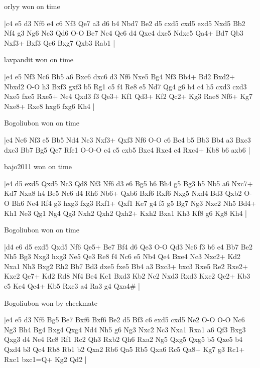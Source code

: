 \showboard

orlyy won on time

\makegametitle
|c4 e5 d3 Nf6 e4 c6 Nf3 Qe7 a3 d6 b4 Nbd7 Be2 d5 cxd5 cxd5 exd5 Nxd5 Bb2 Nf4 g3 Ng6 Nc3 Qd6 O-O Be7 Ne4 Qc6 d4 Qxe4 dxe5 Ndxe5 Qa4+ Bd7 Qb3 Nxf3+ Bxf3 Qe6 Bxg7 Qxb3 Rab1  |

\showboard

lavpandit won on time

\makegametitle
|e4 e5 Nf3 Nc6 Bb5 a6 Bxc6 dxc6 d3 Nf6 Nxe5 Bg4 Nf3 Bb4+ Bd2 Bxd2+ Nbxd2 O-O h3 Bxf3 gxf3 b5 Rg1 c5 f4 Re8 e5 Nd7 Qg4 g6 h4 c4 h5 cxd3 cxd3 Nxe5 fxe5 Rxe5+ Ne4 Qxd3 f3 Qe3+ Kf1 Qd3+ Kf2 Qc2+ Kg3 Rae8 Nf6+ Kg7 Nxe8+ Rxe8 hxg6 fxg6 Kh4  |

\showboard

Bogoliubon won on time

\makegametitle
|e4 Nc6 Nf3 e5 Bb5 Nd4 Nc3 Nxf3+ Qxf3 Nf6 O-O c6 Bc4 b5 Bb3 Bb4 a3 Bxc3 dxc3 Bb7 Bg5 Qe7 Rfe1 O-O-O c4 c5 cxb5 Bxe4 Rxe4 c4 Rxc4+ Kb8 b6 axb6  |

\showboard

bajo2011 won on time

\makegametitle
|e4 d5 exd5 Qxd5 Nc3 Qd8 Nf3 Nf6 d3 e6 Bg5 h6 Bh4 g5 Bg3 h5 Nb5 a6 Nxc7+ Kd7 Nxa8 h4 Be5 Nc6 d4 Rh6 Nb6+ Qxb6 Bxf6 Rxf6 Nxg5 Nxd4 Bd3 Qxb2 O-O Bh6 Ne4 Rf4 g3 hxg3 fxg3 Rxf1+ Qxf1 Ke7 g4 f5 g5 Bg7 Ng3 Nxc2 Nh5 Bd4+ Kh1 Ne3 Qg1 Ng4 Qg3 Nxh2 Qxh2 Qxh2+ Kxh2 Bxa1 Kh3 Kf8 g6 Kg8 Kh4  |

\showboard

Bogoliubon won on time

\makegametitle
|d4 e6 d5 exd5 Qxd5 Nf6 Qe5+ Be7 Bf4 d6 Qe3 O-O Qd3 Nc6 f3 b6 e4 Bb7 Be2 Nh5 Bg3 Nxg3 hxg3 Ne5 Qe3 Re8 f4 Nc6 e5 Nb4 Qe4 Bxe4 Nc3 Nxc2+ Kd2 Nxa1 Nh3 Bxg2 Rh2 Bb7 Bd3 dxe5 fxe5 Bb4 a3 Bxc3+ bxc3 Rxe5 Re2 Rxe2+ Kxe2 Qe7+ Kd2 Rd8 Nf4 Be4 Kc1 Bxd3 Kb2 Nc2 Nxd3 Rxd3 Kxc2 Qe2+ Kb3 c5 Kc4 Qe4+ Kb5 Rxc3 a4 Ra3 g4 Qxa4\#  |

\showboard

Bogoliubon won by checkmate

\makegametitle
|e4 e5 d3 Nf6 Bg5 Be7 Bxf6 Bxf6 Be2 d5 Bf3 c6 exd5 cxd5 Ne2 O-O O-O Nc6 Ng3 Bh4 Bg4 Bxg4 Qxg4 Nd4 Nh5 g6 Ng3 Nxc2 Nc3 Nxa1 Rxa1 a6 Qf3 Bxg3 Qxg3 d4 Ne4 Rc8 Rf1 Rc2 Qh3 Rxb2 Qh6 Rxa2 Ng5 Qxg5 Qxg5 b5 Qxe5 b4 Qxd4 b3 Qc4 Rb8 Rb1 b2 Qxa2 Rb6 Qa5 Rb5 Qxa6 Rc5 Qa8+ Kg7 g3 Rc1+ Rxc1 bxc1=Q+ Kg2 Qd2  |

